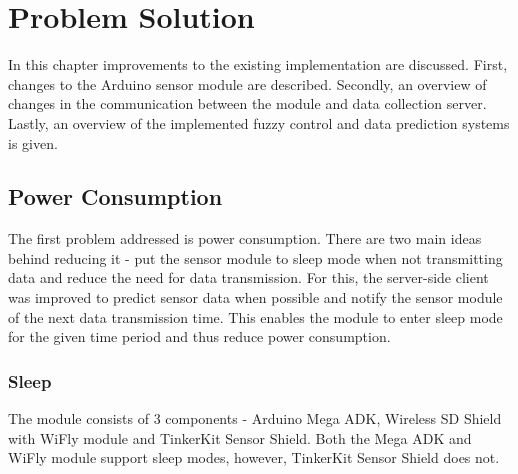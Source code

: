 
\chapter{Problem Solution} %

In this chapter improvements to the existing implementation are discussed. First, changes to the Arduino sensor module are described. Secondly, an overview of changes in the communication between the module and data collection server. Lastly, an overview of the implemented fuzzy control and data prediction systems is given.


\ifpdf
    \graphicspath{{X/figures/PNG/}{X/figures/PDF/}{X/figures/}}
\else
    \graphicspath{{X/figures/EPS/}{X/figures/}}
\fi

\section{Power Consumption}

The first problem addressed is power consumption. There are two main ideas behind reducing it - put the sensor module to sleep mode when not transmitting data and reduce the need for data transmission. For this, the server-side client was improved to predict sensor data when possible and notify the sensor module of the next data transmission time. This enables the module to enter sleep mode for the given time period and thus reduce power consumption. 

\subsection{Sleep}

The module consists of 3 components - Arduino Mega ADK, Wireless SD Shield with WiFly module and TinkerKit Sensor Shield. Both the Mega ADK and WiFly module support sleep modes, however, TinkerKit Sensor Shield does not.

